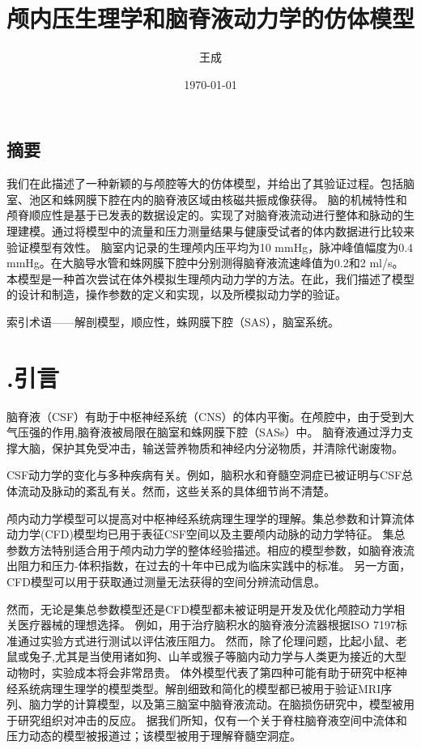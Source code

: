 \documentclass[12pt]{article}
\title{颅内压生理学和脑脊液动力学的仿体模型}
\author{王成}
\date{\today}
\begin{document}
\maketitle

\tableofcontents
\newpage

\begin{center}
    \section*{摘要}
\end{center}

我们在此描述了一种新颖的与颅腔等大的仿体模型，并给出了其验证过程。包括脑室、池区和蛛网膜下腔在内的脑脊液区域由核磁共振成像获得。
脑的机械特性和颅脊顺应性是基于已发表的数据设定的。实现了对脑脊液流动进行整体和脉动的生理建模。通过将模型中的流量和压力测量结果与健康受试者的体内数据进行比较来验证模型有效性。
脑室内记录的生理颅内压平均为10 mmHg，脉冲峰值幅度为0.4 mmHg。在大脑导水管和蛛网膜下腔中分别测得脑脊液流速峰值为0.2和2 ml/s。
本模型是一种首次尝试在体外模拟生理颅内动力学的方法。在此，我们描述了模型的设计和制造，操作参数的定义和实现，以及所模拟动力学的验证。

索引术语——解剖模型，顺应性，蛛网膜下腔（SAS），脑室系统。

\section*{\uppercase\expandafter{}.引言}

脑脊液（CSF）有助于中枢神经系统（CNS）的体内平衡。在颅腔中，由于受到大气压强的作用,脑脊液被局限在脑室和蛛网膜下腔（SASs）中。
脑脊液通过浮力支撑大脑，保护其免受冲击，输送营养物质和神经内分泌物质，并清除代谢废物。

CSF动力学的变化与多种疾病有关。例如，脑积水和脊髓空洞症已被证明与CSF总体流动及脉动的紊乱有关。然而，这些关系的具体细节尚不清楚。

颅内动力学模型可以提高对中枢神经系统病理生理学的理解。集总参数和计算流体动力学(CFD)模型均已用于表征CSF空间以及主要颅内动脉的动力学特征。
集总参数方法特别适合用于颅内动力学的整体经验描述。相应的模型参数，如脑脊液流出阻力和压力-体积指数，在过去的十年中已成为临床实践中的标准。
另一方面，CFD模型可以用于获取通过测量无法获得的空间分辨流动信息。

然而，无论是集总参数模型还是CFD模型都未被证明是开发及优化颅腔动力学相关医疗器械的理想选择。
例如，用于治疗脑积水的脑脊液分流器根据ISO 7197标准通过实验方式进行测试以评估液压阻力。
然而，除了伦理问题，比起小鼠、老鼠或兔子,尤其是当使用诸如狗、山羊或猴子等脑内动力学与人类更为接近的大型动物时，实验成本将会非常昂贵。
体外模型代表了第四种可能有助于研究中枢神经系统病理生理学的模型类型。解剖细致和简化的模型都已被用于验证MRI序列、脑力学的计算模型，以及第三脑室中脑脊液流动。在脑损伤研究中，模型被用于研究组织对冲击的反应。
据我们所知，仅有一个关于脊柱脑脊液空间中流体和压力动态的模型被报道过；该模型被用于理解脊髓空洞症。
\end{document}
